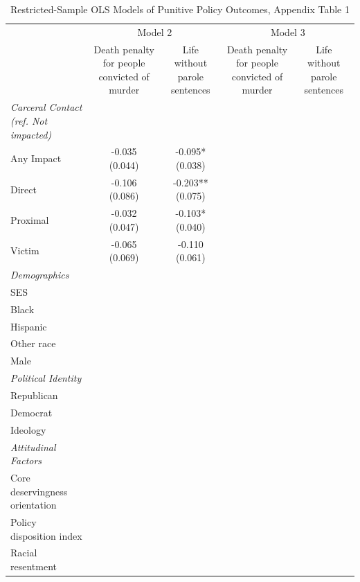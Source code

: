 \begin{table}[!htbp]
\centering
\caption{Restricted-Sample OLS Models of Punitive Policy Outcomes, Appendix Table 1}
\label{tab:appendix\_punish\_restricted\_1}
\begin{threeparttable}
\begin{tabular}{lcccc}
\toprule
 & \multicolumn{2}{c}{Model 2} & \multicolumn{2}{c}{Model 3}
 \\
\cmidrule(lr){2-3} \cmidrule(lr){4-5}
 & Death penalty for people convicted of murder & Life without parole sentences & Death penalty for people convicted of murder & Life without parole sentences
 \\
\midrule
\textit{Carceral Contact (ref. Not impacted)} &  &  &  & 
\\
Any Impact & \makecell[c]{-0.035 \\ (0.044)} & \makecell[c]{-0.095* \\ (0.038)} &  &  \\
Direct & \makecell[c]{-0.106 \\ (0.086)} & \makecell[c]{-0.203** \\ (0.075)} &  &  \\
Proximal & \makecell[c]{-0.032 \\ (0.047)} & \makecell[c]{-0.103* \\ (0.040)} &  &  \\
Victim & \makecell[c]{-0.065 \\ (0.069)} & \makecell[c]{-0.110 \\ (0.061)} &  &  \\
\addlinespace
\textit{Demographics} &  &  &  &  \\
SES &  &  &  &  \\
Black &  &  &  &  \\
Hispanic &  &  &  &  \\
Other race &  &  &  &  \\
Male &  &  &  &  \\
\addlinespace
\textit{Political Identity} &  &  &  &  \\
Republican &  &  &  &  \\
Democrat &  &  &  &  \\
Ideology &  &  &  &  \\
\addlinespace
\textit{Attitudinal Factors} &  &  &  &  \\
Core deservingness orientation &  &  &  &  \\
Policy disposition index &  &  &  &  \\
Racial resentment &  &  &  &  \\

\end{tabular}
\end{threeparttable}
\end{table}
